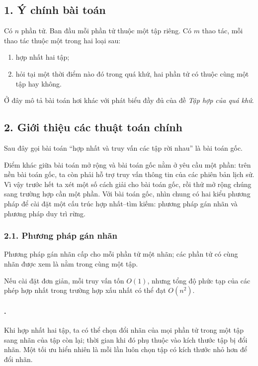 \documentclass[11pt]{article}
\begin{document}
\subsection*{1. Ý chính bài toán}

Có \(n\) phần tử. Ban đầu mỗi phần tử thuộc một tập riêng. Có \(m\) thao tác,
mỗi thao tác thuộc một trong hai loại sau:

\begin{enumerate}
  \item hợp nhất hai tập;
  \item hỏi tại một thời điểm nào đó trong quá khứ, hai phần tử có thuộc cùng
  một tập hay không.
\end{enumerate}

Ở đây mô tả bài toán hơi khác với phát biểu đầy đủ của đề
\emph{Tập hợp của quá khứ}.

\subsection*{2. Giới thiệu các thuật toán chính}

Sau đây gọi bài toán ``hợp nhất và truy vấn các tập rời nhau'' là bài toán
gốc.

Điểm khác giữa bài toán mở rộng và bài toán gốc nằm ở yêu cầu
 một phần: trên nền bài toán gốc, ta còn phải hỗ trợ truy vấn
thông tin của các phiên bản lịch sử. Vì vậy trước hết ta xét một số cách giải
cho bài toán gốc, rồi thử mở rộng chúng sang trường hợp cần
 một phần. Với bài toán gốc, nhìn chung có hai kiểu phương
pháp để cài đặt một cấu trúc hợp nhất--tìm kiếm: phương pháp gán nhãn và
phương pháp duy trì rừng.

\subsubsection*{2.1. Phương pháp gán nhãn}

Phương pháp gán nhãn cấp cho mỗi phần tử một nhãn; các phần tử có cùng nhãn
được xem là nằm trong cùng một tập.

Nếu cài đặt đơn giản, mỗi truy vấn tốn \(O(1)\), nhưng tổng độ phức tạp của
các phép hợp nhất trong trường hợp xấu nhất có thể đạt \(O(n^2)\).

\paragraph{.}
Khi hợp nhất hai tập, ta có thể chọn đổi nhãn của mọi phần tử trong một tập
sang nhãn của tập còn lại; thời gian khi đó phụ thuộc vào kích thước tập bị
đổi nhãn. Một tối ưu hiển nhiên là mỗi lần luôn chọn tập có kích thước nhỏ hơn
để đổi nhãn.
\end{document}
